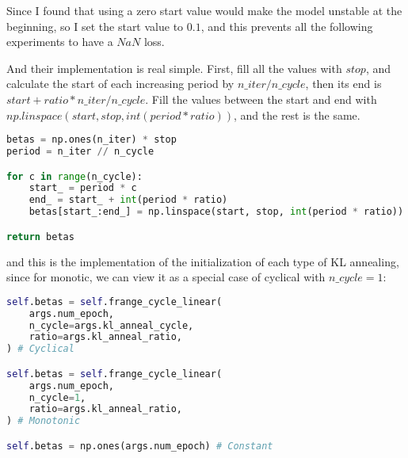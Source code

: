 Since I found that using a zero start value would make the model unstable at the beginning, so I set the start value to $0.1$, and this prevents all the following experiments to have a $NaN$ loss.

And their implementation is real simple. First, fill all the values with $stop$, and calculate the start of each increasing period by $n\_iter / n\_cycle$, then its end is $start + ratio * n\_iter / n\_cycle$. Fill the values between the start and end with $np.linspace(start, stop, int(period * ratio))$, and the rest is the same.

\begin{lstlisting}[language=Python]
betas = np.ones(n_iter) * stop
period = n_iter // n_cycle

for c in range(n_cycle):
    start_ = period * c
    end_ = start_ + int(period * ratio)
    betas[start_:end_] = np.linspace(start, stop, int(period * ratio))

return betas
\end{lstlisting}

and this is the implementation of the initialization of each type of KL annealing, since for monotic, we can view it as a special case of cyclical with $n\_cycle = 1$:

\begin{lstlisting}[language=Python]
self.betas = self.frange_cycle_linear(
    args.num_epoch,
    n_cycle=args.kl_anneal_cycle,
    ratio=args.kl_anneal_ratio,
) # Cyclical

self.betas = self.frange_cycle_linear(
    args.num_epoch,
    n_cycle=1,
    ratio=args.kl_anneal_ratio,
) # Monotonic

self.betas = np.ones(args.num_epoch) # Constant
\end{lstlisting}



